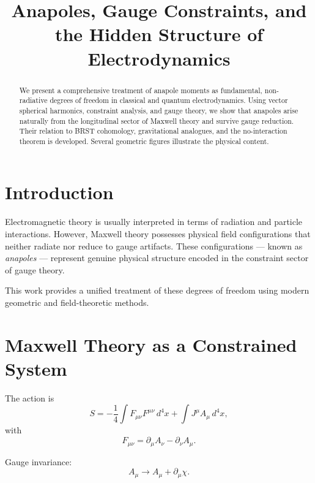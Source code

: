 \documentclass[11pt]{article}
\title{\textbf{Anapoles, Gauge Constraints, and the Hidden Structure of Electrodynamics}}
\author{}
\date{}
\begin{document}
\maketitle

\begin{abstract}
We present a comprehensive treatment of anapole moments as fundamental, non-radiative degrees of freedom in classical and quantum electrodynamics. Using vector spherical harmonics, constraint analysis, and gauge theory, we show that anapoles arise naturally from the longitudinal sector of Maxwell theory and survive gauge reduction. Their relation to BRST cohomology, gravitational analogues, and the no-interaction theorem is developed. Several geometric figures illustrate the physical content.
\end{abstract}

\tableofcontents
\newpage

\section{Introduction}

Electromagnetic theory is usually interpreted in terms of radiation and particle interactions. 
However, Maxwell theory possesses physical field configurations that neither radiate nor reduce to gauge artifacts.
These configurations — known as \emph{anapoles} — represent genuine physical structure encoded in the constraint sector of gauge theory.

This work provides a unified treatment of these degrees of freedom using modern geometric and field-theoretic methods.

\section{Maxwell Theory as a Constrained System}

The action is
\begin{equation}
S = -\frac14 \int F_{\mu\nu}F^{\mu\nu}\, d^4x + \int J^\mu A_\mu\, d^4x,
\end{equation}
with
\begin{equation}
F_{\mu\nu} = \partial_\mu A_\nu - \partial_\nu A_\mu.
\end{equation}

Gauge invariance:
\begin{equation}
A_\mu \rightarrow A_\mu + \partial_\mu \chi.
\end{equation}
\end{document}
